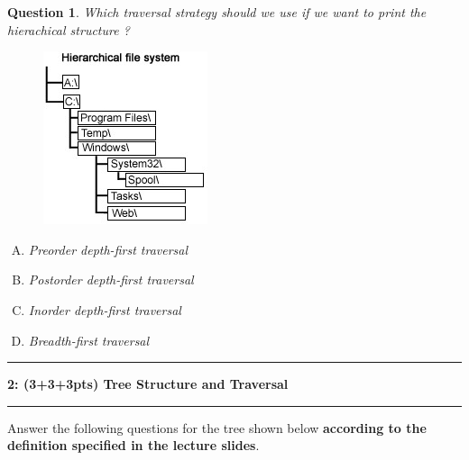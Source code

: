 \documentclass{article}
\newcommand\question[2]{\vspace{.25in}\hrule\textbf{#1: #2}\vspace{.5em}\hrule\vspace{.10in}}
\newtheorem{Q}{Question}
\begin{document}
\vspace{0.5cm}

\pagebreak

\begin{Q} Which traversal strategy should we use if we want to print the hierachical structure ?

	\begin{figure}[h]
		\centering
		\includegraphics[width=0.27\linewidth]{hierarchy}
		\label{fig:hierarchy}
	\end{figure}
	\begin{enumerate}[(A)]
		\item Preorder depth-first traversal
		\item Postorder depth-first traversal
		\item Inorder depth-first traversal
		\item Breadth-first traversal
	\end{enumerate}
\end{Q}


\question{2}{(3+3+3pts) Tree Structure and Traversal}

Answer the following questions for the tree shown below \textbf{according to  the definition specified in the lecture slides}.
\end{document}
